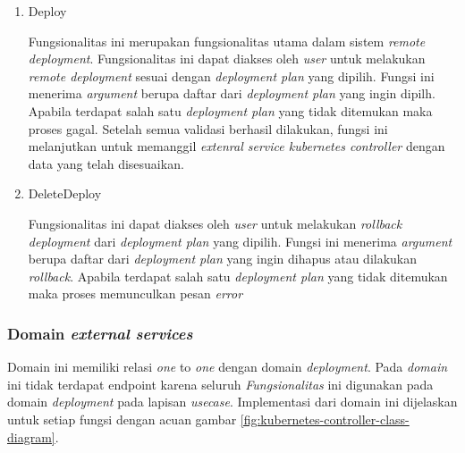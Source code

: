 \begin{enumerate}
    \item Deploy

          Fungsionalitas ini merupakan fungsionalitas utama dalam sistem \textit{remote deployment}. Fungsionalitas ini dapat diakses oleh \textit{user} untuk melakukan \textit{remote deployment} sesuai dengan \textit{deployment plan} yang dipilih. Fungsi ini menerima \textit{argument} berupa daftar dari \textit{deployment plan} yang ingin dipilh. Apabila terdapat salah satu \textit{deployment plan} yang tidak ditemukan maka proses gagal. Setelah semua validasi berhasil dilakukan, fungsi ini melanjutkan untuk memanggil \textit{extenral service kubernetes controller} dengan data yang telah disesuaikan.

    \item DeleteDeploy

          Fungsionalitas ini dapat diakses oleh \textit{user} untuk melakukan \textit{rollback deployment} dari \textit{deployment plan} yang dipilih. Fungsi ini menerima \textit{argument} berupa daftar dari \textit{deployment plan} yang ingin dihapus atau dilakukan \textit{rollback}. Apabila terdapat salah satu \textit{deployment plan} yang tidak ditemukan maka proses memunculkan pesan \textit{error}

\end{enumerate}

\subsubsection{Domain \textit{external services}}

Domain ini memiliki relasi \textit{one} to \textit{one} dengan domain \textit{deployment}. Pada \textit{domain} ini tidak terdapat endpoint karena seluruh \textit{Fungsionalitas} ini digunakan pada domain \textit{deployment} pada lapisan \textit{usecase}. Implementasi dari domain ini dijelaskan untuk setiap fungsi dengan acuan gambar \ref{fig:kubernetes-controller-class-diagram}.

\pagebreak

